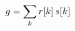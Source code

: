 \documentclass[preview]{standalone}
\begin{document}
\begin{align*}
\special{dvisvgm:raw <g id='unique000'>}g=\sum_k r[k]\,s[k]\special{dvisvgm:raw </g>}
\end{align*}
\end{document}
